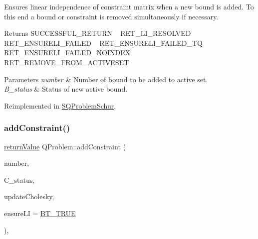 Ensures linear independence of constraint matrix when a new bound is added. To this end a bound or constraint is removed simultaneously if necessary. \begin{DoxyReturn}{Returns}
S\+U\+C\+C\+E\+S\+S\+F\+U\+L\+\_\+\+R\+E\+T\+U\+RN ~\newline
 R\+E\+T\+\_\+\+L\+I\+\_\+\+R\+E\+S\+O\+L\+V\+ED ~\newline
 R\+E\+T\+\_\+\+E\+N\+S\+U\+R\+E\+L\+I\+\_\+\+F\+A\+I\+L\+ED ~\newline
 R\+E\+T\+\_\+\+E\+N\+S\+U\+R\+E\+L\+I\+\_\+\+F\+A\+I\+L\+E\+D\+\_\+\+TQ ~\newline
 R\+E\+T\+\_\+\+E\+N\+S\+U\+R\+E\+L\+I\+\_\+\+F\+A\+I\+L\+E\+D\+\_\+\+N\+O\+I\+N\+D\+EX ~\newline
 R\+E\+T\+\_\+\+R\+E\+M\+O\+V\+E\+\_\+\+F\+R\+O\+M\+\_\+\+A\+C\+T\+I\+V\+E\+S\+ET 
\end{DoxyReturn}

\begin{DoxyParams}{Parameters}
{\em number} & Number of bound to be added to active set. \\
\hline
{\em B\+\_\+status} & Status of new active bound. \\
\hline
\end{DoxyParams}


Reimplemented in \hyperlink{class_s_q_problem_schur_a2f4c039379bf3762dba1435f0beedd3b}{S\+Q\+Problem\+Schur}.

\mbox{\label{class_q_problem_afa750995f0d344547e59cb91b3446abb}} 
\subsubsection{\texorpdfstring{add\+Constraint()}{addConstraint()}}
{\footnotesize\ttfamily \hyperlink{_message_handling_8hpp_a81d556f613bfbabd0b1f9488c0fa865e}{return\+Value} Q\+Problem\+::add\+Constraint (\begin{DoxyParamCaption}\item[{\hyperlink{_types_8hpp_ab6fd6105e64ed14a0c9281326f05e623}{int\+\_\+t}}]{number,  }\item[{\hyperlink{_types_8hpp_a70a6a40d261a015ead8d43aa589383a4}{Subject\+To\+Status}}]{C\+\_\+status,  }\item[{\hyperlink{_types_8hpp_a20f82124c82b6f5686a7fce454ef9089}{Boolean\+Type}}]{update\+Cholesky,  }\item[{\hyperlink{_types_8hpp_a20f82124c82b6f5686a7fce454ef9089}{Boolean\+Type}}]{ensure\+LI = {\ttfamily \hyperlink{_types_8hpp_a20f82124c82b6f5686a7fce454ef9089a34c57965bfb07125b09326a69019f9c6}{B\+T\+\_\+\+T\+R\+UE}} }\end{DoxyParamCaption})\hspace{0.3cm}{\ttfamily [protected]}, {\ttfamily [virtual]}}

